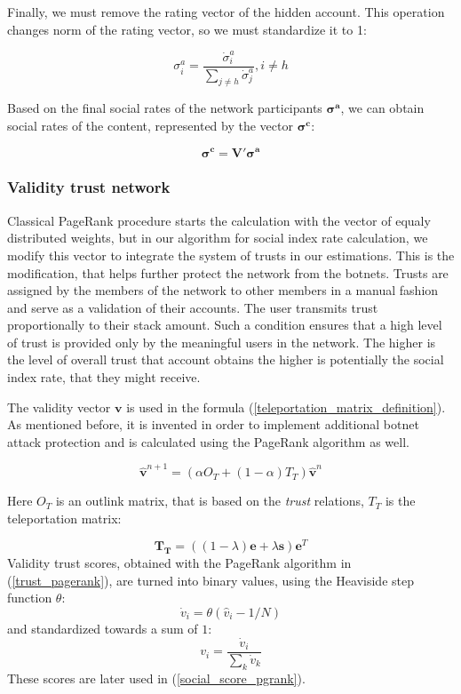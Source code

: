 \documentclass[a4paper,12pt]{article}
\begin{document}
	Finally, we must remove the rating vector of the hidden account. This operation changes norm of the rating vector, so we must standardize it to 1:
	
	$$
	\sigma^a_i = \frac{\dot{\sigma}^a_i}{\sum_{j \ne h} \dot{\sigma}^a_j}, i \ne h
	$$
	
	
	Based on the final social rates of the network participants $\boldsymbol{\sigma^a}$, we can obtain social rates of the content, represented by the vector $\boldsymbol{\sigma^c}$:
	
	$$
	\boldsymbol{\sigma^c} = \boldsymbol{V'}\boldsymbol{\sigma^a}
	$$
	
\subsubsection{Validity trust network}
\label{validity}
	Classical PageRank procedure starts the calculation with the vector of equaly distributed weights, but in our algorithm for social index rate calculation, we modify this vector to integrate the system of trusts in our estimations. This is the modification, that helps further protect the network from the botnets. Trusts are assigned by the members of the network to other members in a manual fashion and serve as a validation of their accounts. The user transmits trust proportionally to their stack amount. Such a condition ensures that a high level of trust is provided only by the meaningful users in the network. The higher is the level of overall trust that account obtains the higher is potentially the social index rate, that they might receive.
	
The validity vector $\boldsymbol{v}$ is used in the formula (\ref{teleportation_matrix_definition}). As mentioned before, it is invented in order to implement additional botnet attack protection and is calculated using the PageRank algorithm as well.
	
	\begin{equation}
	\label{trust_pagerank}
	\boldsymbol{\hat{v}}^{n+1} = (\alpha O_T+(1-\alpha)T_T) \boldsymbol{\hat{v}}^{n}
	\end{equation}
	
	Here $O_T$ is an outlink matrix, that is based on the \textit{trust} relations, $T_T$ is the teleportation matrix:
	
	$$
        \boldsymbol{T_T} = ((1 - \lambda) \boldsymbol{e} + \lambda \boldsymbol{s}) \boldsymbol{e}^T
	$$
	Validity trust scores, obtained with the PageRank algorithm in (\ref{trust_pagerank}), are turned into binary values, using the Heaviside step function $\theta$:
	$$
	\dot{v}_i = \theta({\hat{v}_i}-1/N)
	$$
and standardized towards a sum of $1$:
	$$
	v_i = \frac{\dot{v}_i}{\sum_k{\dot{v}_k}}
	$$
	These scores are later used in (\ref{social_score_pgrank}).
\end{document}
